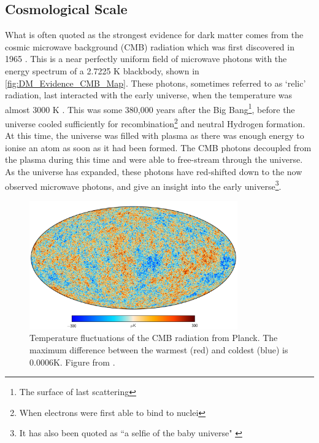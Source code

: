 \subsection{Cosmological Scale}

\par
What is often quoted as the strongest evidence for dark matter comes from the cosmic microwave background (CMB) radiation which was first discovered in 1965 \cite{cmb_origins_ref}.
This is a near perfectly uniform field of microwave photons with the energy spectrum of a 2.7225 K blackbody, shown in \autoref{fig:DM_Evidence_CMB_Map}.
These photons, sometimes referred to as `relic' radiation, last interacted with the early universe, when the temperature was almost 3000 K \cite{bigbang_nucleosynthesis_ref}.
This was some 380,000 years after the Big Bang\footnote{The surface of last scattering}, before the universe cooled sufficiently for recombination\footnote{When electrons were first able to bind to nuclei} and neutral Hydrogen formation.
At this time, the universe was filled with plasma as there was enough energy to ionise an atom as soon as it had been formed.
The CMB photons decoupled from the plasma during this time and were able to free-stream through the universe.
As the universe has expanded, these photons have red-shifted down to the now observed microwave photons, and give an insight into the early universe\footnote{It has also been quoted as ``a selfie of the baby universe" \cite{marisarthurs_thesis_ref}}.

\begin{figure}[!htbp]%
    \centering
    \includegraphics[width=0.8\textwidth]{Figures/DarkMatterEvidence/cmb_radiation.png}
    \caption[Temperature fluctuations of the CMB radiation]{Temperature fluctuations of the CMB radiation from Planck.
             The maximum difference between the warmest (red) and coldest (blue) is 0.0006K.
             Figure from \cite{plank_result_ref}.}
    \label{fig:DM_Evidence_CMB_Map}
\end{figure}


